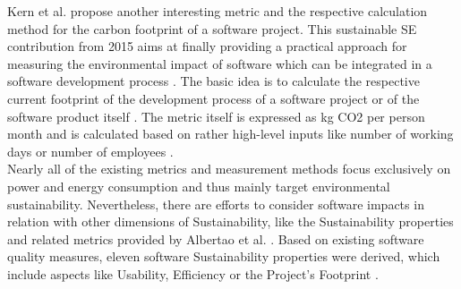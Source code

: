 \documentclass[oribibl]{llncs}
\begin{document}
Kern et al. \cite{kern_impacts_2015} propose another interesting metric and the respective calculation method for the carbon footprint of a software project. This sustainable SE contribution from 2015 aims at finally providing a practical approach for measuring the environmental impact of software which can be integrated in a software development process \cite{kern_impacts_2015}. The basic idea is to calculate the respective current footprint of the development process of a software project or of the software product itself \cite{kern_impacts_2015}. The metric itself is expressed as kg CO2 %
per person month and is calculated based on rather high-level inputs like number of working days or number of employees \cite{kern_impacts_2015}.\\
Nearly all of the existing metrics and measurement methods focus exclusively on power and energy consumption and thus mainly target environmental sustainability. %
Nevertheless, there are efforts to consider software impacts in relation with other dimensions of Sustainability, like the Sustainability properties and related metrics provided by Albertao et al. \cite{albertao_measuring_2010}. 
Based on existing software quality measures, eleven software Sustainability properties were derived, which include aspects like Usability, Efficiency or the Project's Footprint \cite{albertao_measuring_2010}. 


\end{document}

